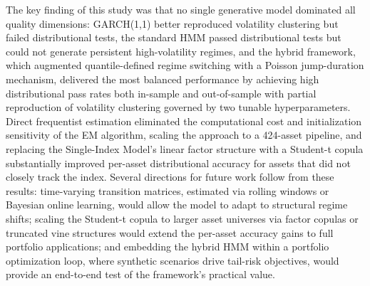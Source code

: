 The key finding of this study was that no single generative model dominated all quality dimensions: GARCH(1,1) better reproduced volatility clustering but failed distributional tests, the standard HMM passed distributional tests but could not generate persistent high-volatility regimes, and the hybrid framework, which augmented quantile-defined regime switching with a Poisson jump-duration mechanism, delivered the most balanced performance by achieving high distributional pass rates both in-sample and out-of-sample with partial reproduction of volatility clustering governed by two tunable hyperparameters. Direct frequentist estimation eliminated the computational cost and initialization sensitivity of the EM algorithm, scaling the approach to a 424-asset pipeline, and replacing the Single-Index Model's linear factor structure with a Student-t copula substantially improved per-asset distributional accuracy for assets that did not closely track the index. Several directions for future work follow from these results: time-varying transition matrices, estimated via rolling windows or Bayesian online learning, would allow the model to adapt to structural regime shifts; scaling the Student-t copula to larger asset universes via factor copulas or truncated vine structures would extend the per-asset accuracy gains to full portfolio applications; and embedding the hybrid HMM within a portfolio optimization loop, where synthetic scenarios drive tail-risk objectives, would provide an end-to-end test of the framework's practical value.
